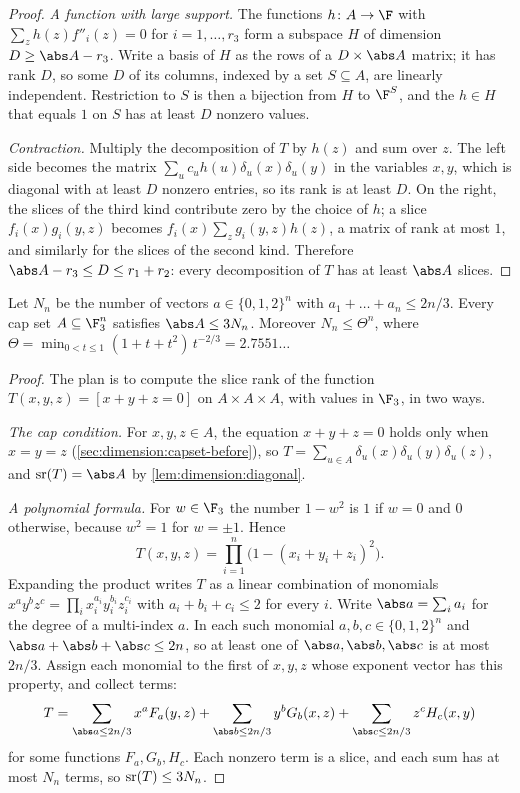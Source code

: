 \begin{refsection}
\begin{proof}
\emph{A function with large support.} The functions $h\colon A\to\F$ with $\sum_zh(z)f''_i(z)=0$ for $i=1,\dots,r_3$ form a subspace $H$ of dimension $D\ge\abs A-r_3$. Write a basis of $H$ as the rows of a $D\times\abs A$ matrix; it has rank $D$, so some $D$ of its columns, indexed by a set $S\subseteq A$, are linearly independent. Restriction to $S$ is then a bijection from $H$ to $\F^S$, and the $h\in H$ that equals $1$ on $S$ has at least $D$ nonzero values.

\emph{Contraction.} Multiply the decomposition of $T$ by $h(z)$ and sum over $z$. The left side becomes the matrix $\sum_uc_uh(u)\delta_u(x)\delta_u(y)$ in the variables $x,y$, which is diagonal with at least $D$ nonzero entries, so its rank is at least $D$. On the right, the slices of the third kind contribute zero by the choice of $h$; a slice $f_i(x)g_i(y,z)$ becomes $f_i(x)\sum_zg_i(y,z)h(z)$, a matrix of rank at most $1$, and similarly for the slices of the second kind. Therefore $\abs A-r_3\le D\le r_1+r_2$: every decomposition of $T$ has at least $\abs A$ slices.
\end{proof}

\begin{theorem}\label{thm:dimension:capset}
Let $N_n$ be the number of vectors $a\in\{0,1,2\}^n$ with $a_1+\dots+a_n\le2n/3$. Every cap set $A\subseteq\F_3^n$ satisfies $\abs A\le3N_n$. Moreover $N_n\le\Theta^n$, where $\Theta=\min_{0<t\le1}(1+t+t^2)\,t^{-2/3}=2.7551\ldots$
\end{theorem}

\begin{proof}
The plan is to compute the slice rank of the function $T(x,y,z)=[x+y+z=0]$ on $A\times A\times A$, with values in $\F_3$, in two ways.

\emph{The cap condition.} For $x,y,z\in A$, the equation $x+y+z=0$ holds only when $x=y=z$ (\cref{sec:dimension:capset-before}), so $T=\sum_{u\in A}\delta_u(x)\delta_u(y)\delta_u(z)$, and $\dimensionSR(T)=\abs A$ by \cref{lem:dimension:diagonal}.

\emph{A polynomial formula.} For $w\in\F_3$ the number $1-w^2$ is $1$ if $w=0$ and $0$ otherwise, because $w^2=1$ for $w=\pm1$. Hence
\[
T(x,y,z)=\prod_{i=1}^n\big(1-(x_i+y_i+z_i)^2\big).
\]
Expanding the product writes $T$ as a linear combination of monomials $x^ay^bz^c=\prod_ix_i^{a_i}y_i^{b_i}z_i^{c_i}$ with $a_i+b_i+c_i\le2$ for every $i$. Write $\abs a=\sum_ia_i$ for the degree of a multi-index $a$. In each such monomial $a,b,c\in\{0,1,2\}^n$ and $\abs a+\abs b+\abs c\le2n$, so at least one of $\abs a,\abs b,\abs c$ is at most $2n/3$. Assign each monomial to the first of $x,y,z$ whose exponent vector has this property, and collect terms:
\[
T=\sum_{\abs a\le2n/3}x^aF_a(y,z)+\sum_{\abs b\le2n/3}y^bG_b(x,z)+\sum_{\abs c\le2n/3}z^cH_c(x,y)
\]
for some functions $F_a,G_b,H_c$. Each nonzero term is a slice, and each sum has at most $N_n$ terms, so $\operatorname{sr}(T)\le3N_n$.


\end{proof}
\end{refsection}

